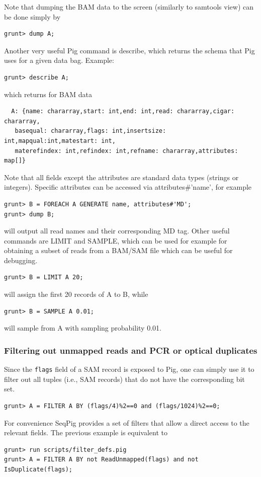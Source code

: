 Note that dumping the BAM data to the screen (similarly to samtools view)
can be done simply by
\begin{lstlisting}
grunt> dump A;
\end{lstlisting}
Another very useful Pig command is describe, which returns the schema that Pig
uses for a given data bag. Example:
\begin{lstlisting}
grunt> describe A;
\end{lstlisting}
which returns for BAM data
\begin{lstlisting}  
  A: {name: chararray,start: int,end: int,read: chararray,cigar: chararray,
   basequal: chararray,flags: int,insertsize: int,mapqual:int,matestart: int,
   materefindex: int,refindex: int,refname: chararray,attributes: map[]}
\end{lstlisting}
Note that all fields except the attributes are standard data types (strings
or integers). Specific attributes can be accessed via attributes\#'name', for
example
\begin{lstlisting} 
grunt> B = FOREACH A GENERATE name, attributes#'MD';
grunt> dump B;
\end{lstlisting}
will output all read names and their corresponding MD tag.
Other useful commands are LIMIT and SAMPLE, which can be used for example for obtaining
a subset of reads from a BAM/SAM file which can be useful for debugging.
\begin{lstlisting} 
grunt> B = LIMIT A 20;
\end{lstlisting}
will assign the first 20 records of A to B, while
\begin{lstlisting}
grunt> B = SAMPLE A 0.01;
\end{lstlisting}
will sample from A with sampling probability 0.01.

\subsubsection{Filtering out unmapped reads and PCR or optical duplicates}
Since the {\tt flags} field of a SAM record is exposed to Pig, one can simply
use it to filter out all tuples (i.e., SAM records) that do not have the
corresponding bit set.
\begin{lstlisting}
grunt> A = FILTER A BY (flags/4)%2==0 and (flags/1024)%2==0;
\end{lstlisting}
For convenience SeqPig provides a set of filters that allow a direct access
to the relevant fields. The previous example is equivalent to
\begin{lstlisting}
grunt> run scripts/filter_defs.pig
grunt> A = FILTER A BY not ReadUnmapped(flags) and not IsDuplicate(flags);
\end{lstlisting}

